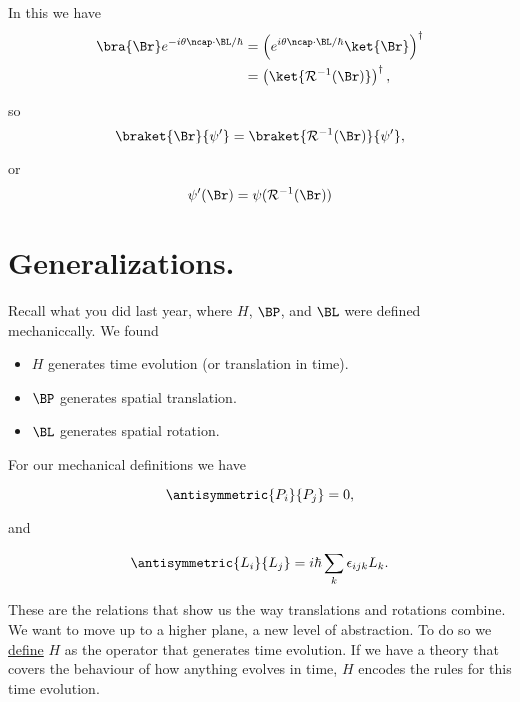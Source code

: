 In this we have
\begin{align*}
\bra{\Br} e^{-i \theta \ncap \cdot \BL/\hbar }
&=
\left( e^{i \theta \ncap \cdot \BL/\hbar } \ket{\Br} \right)^\dagger \\
&=
\left( \ket{\mathcal{R}^{-1}(\Br) } \right)^\dagger,
\end{align*}

so
\begin{equation}\label{eqn:qmTwoL11:410}
\braket{\Br}{\psi'} = 
\braket{\mathcal{R}^{-1}(\Br) }{\psi'},
\end{equation}

or
\begin{equation}\label{eqn:qmTwoL11:430}
\psi'(\Br) = \psi( \mathcal{R}^{-1}(\Br) )
\end{equation}

\section{Generalizations.}

Recall what you did last year, where $H$, $\BP$, and $\BL$ were defined mechaniccally.  We found

\begin{itemize}
\item $H$ generates time evolution (or translation in time).
\item $\BP$ generates spatial translation.
\item $\BL$ generates spatial rotation.
\end{itemize}

For our mechanical definitions we have

\begin{equation}\label{eqn:qmTwoL11:450}
\antisymmetric{P_i}{P_j} = 0,
\end{equation}

and

\begin{equation}\label{eqn:qmTwoL11:470}
\antisymmetric{L_i}{L_j} = i \hbar \sum_k \epsilon_{ijk} L_k.
\end{equation}

These are the relations that show us the way translations and rotations combine.  We want to move up to a higher plane, a new level of abstraction.  To do so we \underline{define} $H$ as the operator that generates time evolution.  If we have a theory that covers the behaviour of how anything evolves in time, $H$ encodes the rules for this time evolution.

